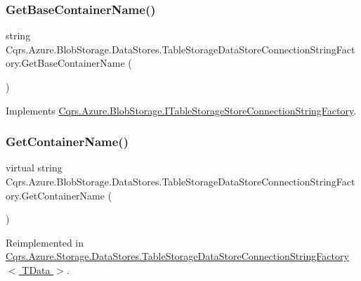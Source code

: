 \subsubsection{\texorpdfstring{Get\+Base\+Container\+Name()}{GetBaseContainerName()}}
{\footnotesize\ttfamily string Cqrs.\+Azure.\+Blob\+Storage.\+Data\+Stores.\+Table\+Storage\+Data\+Store\+Connection\+String\+Factory.\+Get\+Base\+Container\+Name (\begin{DoxyParamCaption}{ }\end{DoxyParamCaption})}



Implements \hyperlink{interfaceCqrs_1_1Azure_1_1BlobStorage_1_1ITableStorageStoreConnectionStringFactory_a1b9bfc9dcb7292e62619fc46e4a85982_a1b9bfc9dcb7292e62619fc46e4a85982}{Cqrs.\+Azure.\+Blob\+Storage.\+I\+Table\+Storage\+Store\+Connection\+String\+Factory}.

\mbox{\label{classCqrs_1_1Azure_1_1BlobStorage_1_1DataStores_1_1TableStorageDataStoreConnectionStringFactory_aa1f5d2a17524e6438ad87e60cbaf6f23_aa1f5d2a17524e6438ad87e60cbaf6f23}} 
\subsubsection{\texorpdfstring{Get\+Container\+Name()}{GetContainerName()}}
{\footnotesize\ttfamily virtual string Cqrs.\+Azure.\+Blob\+Storage.\+Data\+Stores.\+Table\+Storage\+Data\+Store\+Connection\+String\+Factory.\+Get\+Container\+Name (\begin{DoxyParamCaption}{ }\end{DoxyParamCaption})\hspace{0.3cm}{\ttfamily [virtual]}}



Reimplemented in \hyperlink{classCqrs_1_1Azure_1_1Storage_1_1DataStores_1_1TableStorageDataStoreConnectionStringFactory_aa31a217ca659f298016bd8ecabe98387_aa31a217ca659f298016bd8ecabe98387}{Cqrs.\+Azure.\+Storage.\+Data\+Stores.\+Table\+Storage\+Data\+Store\+Connection\+String\+Factory$<$ T\+Data $>$}.

